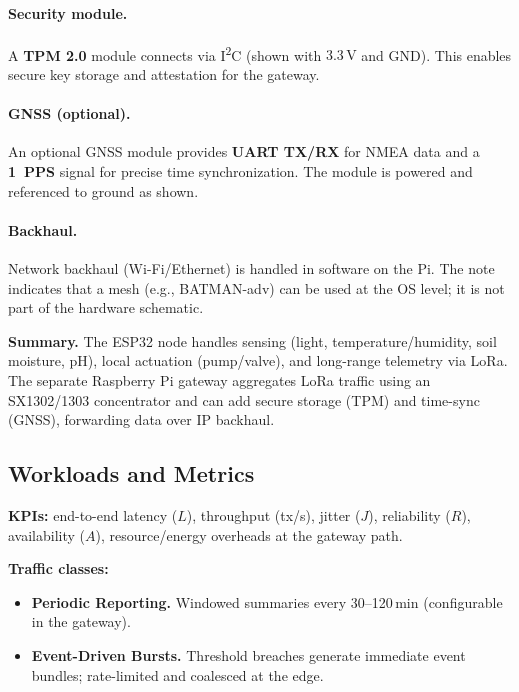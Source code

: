 \documentclass[12pt,onecolumn]{IEEEtran} %
\begin{document}
\paragraph{Security module.}
A \textbf{TPM 2.0} module connects via I\textsuperscript{2}C (shown with $3.3\,\mathrm{V}$ and GND).  
This enables secure key storage and attestation for the gateway.

\paragraph{GNSS (optional).}
An optional GNSS module provides \textbf{UART TX/RX} for NMEA data and a \textbf{1~PPS} signal for precise time synchronization.  
The module is powered and referenced to ground as shown.

\paragraph{Backhaul.}
Network backhaul (Wi-Fi/Ethernet) is handled in software on the Pi.  
The note indicates that a mesh (e.g., BATMAN-adv) can be used at the OS level; it is not part of the hardware schematic.

\medskip
\noindent\textbf{Summary.}
The ESP32 node handles sensing (light, temperature/humidity, soil moisture, pH), local actuation (pump/valve), and long-range
telemetry via LoRa.  
The separate Raspberry Pi gateway aggregates LoRa traffic using an SX1302/1303 concentrator and can add secure storage (TPM)
and time-sync (GNSS), forwarding data over IP backhaul.


\subsection{Workloads and Metrics}
\label{subsec:workloads-metrics}

\textbf{KPIs:} end-to-end latency ($L$), throughput (tx/s), jitter ($J$), reliability ($R$), availability ($A$), resource/energy overheads at the gateway path.

\textbf{Traffic classes:}
\begin{itemize}
    \item \textbf{Periodic Reporting.} Windowed summaries every 30--120\,min (configurable in the gateway).
    \item \textbf{Event-Driven Bursts.} Threshold breaches generate immediate event bundles; rate-limited and coalesced at the edge.
\end{itemize}
\end{document}
